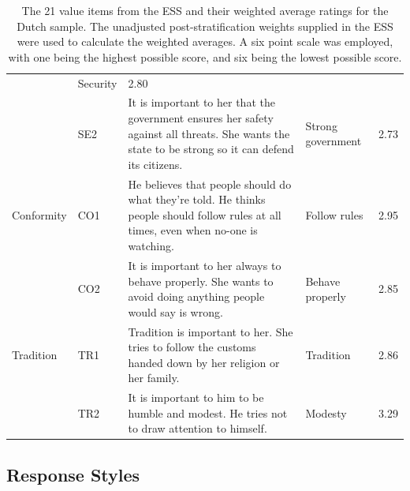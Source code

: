 \documentclass[12pt,letter]{article}\usepackage[]{graphicx}\usepackage[]{xcolor}
\makeatletter
\newenvironment{kframe}{%
 \def\at@end@of@kframe{}%
 \ifinner\ifhmode%
  \def\at@end@of@kframe{\end{minipage}}%
  \begin{minipage}{\columnwidth}%
 \fi\fi%
 \def\FrameCommand##1{\hskip\@totalleftmargin \hskip-\fboxsep
 \colorbox{shadecolor}{##1}\hskip-\fboxsep
     \hskip-\linewidth \hskip-\@totalleftmargin \hskip\columnwidth}%
 \MakeFramed {\advance\hsize-\width
   \@totalleftmargin\z@ \linewidth\hsize
   \@setminipage}}%
 {\par\unskip\endMakeFramed%
 \at@end@of@kframe}
\newenvironment{knitrout}{}{} %
\makeatother
\begin{document}
\begin{table}
\begin{tabularx}{\linewidth}{llXlc}
    &  Security & 2.80 \\[0.5em]
 & SE2 & It is important to her that the government ensures her safety against all threats. She wants the state to be strong so it can defend its citizens. 
    &  Strong government & 2.73 \\[0.5em] \midrule
Conformity &  CO1 & He believes that people should do what they're told. He thinks people should follow rules at all times, even when no-one is watching.
    & Follow rules & 2.95 \\[0.5em]
 & CO2 & It is important to her always to behave properly. She wants to avoid doing anything people would say is wrong.
    &  Behave properly & 2.85 \\[0.5em] \midrule
Tradition & TR1 & Tradition is important to her. She tries to follow the customs handed down by her religion or her family.
    &  Tradition & 2.86 \\[0.5em]
 & TR2 & It is important to him to be humble and modest. He tries not to draw attention to himself.
    &  Modesty & 3.29 \\[0.5em]
\bottomrule
\end{tabularx}
\caption{The 21 value items from the ESS and their weighted average ratings for the Dutch sample. The unadjusted post-stratification weights supplied in the ESS were used to calculate the weighted averages. A six point scale was employed, with one being the highest possible score, and six being the lowest possible score.}
\label{T:val_items}
\end{table}

\subsection*{Response Styles}









\begin{knitrout}\footnotesize
{}\color{fgcolor}\begin{kframe}


{\ttfamily\noindent\itshape\color{messagecolor}{Loading required package: ca}}\end{kframe}
\end{knitrout}
\end{document}
